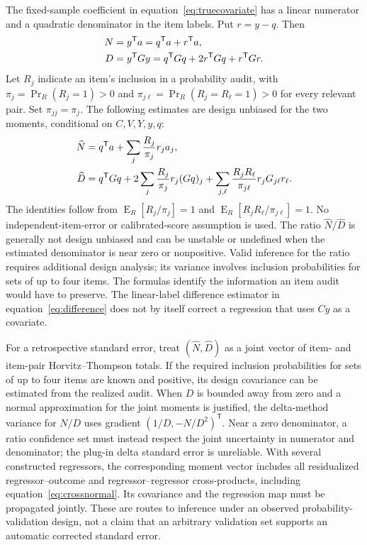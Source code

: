 \documentclass[11pt,letterpaper]{article}
\newcommand{\E}{\operatorname{E}}
\begin{document}
The fixed-sample coefficient in equation~\eqref{eq:truecovariate} has a linear
numerator and a quadratic denominator in the item labels. Put
$r=y-q$. Then
\begin{align}
 N&=y^{\mathsf T}a=q^{\mathsf T}a+r^{\mathsf T}a,\notag\\
 D&=y^{\mathsf T}Gy=q^{\mathsf T}Gq+2r^{\mathsf T}Gq+r^{\mathsf T}Gr.
 \label{eq:covariatemoments}
\end{align}
Let $R_j$ indicate an item's inclusion in a probability audit, with
$\pi_j=\Pr_R(R_j=1)>0$ and
$\pi_{j\ell}=\Pr_R(R_j=R_\ell=1)>0$ for every relevant pair. Set
$\pi_{jj}=\pi_j$. The following estimates are design unbiased for the two
moments, conditional on $C,V,Y,y,q$:
\begin{align}
 \widehat N&=q^{\mathsf T}a+
   \sum_j\frac{R_j}{\pi_j}r_ja_j,\notag\\
 \widehat D&=q^{\mathsf T}Gq+
   2\sum_j\frac{R_j}{\pi_j}r_j(Gq)_j+
   \sum_{j,\ell}\frac{R_jR_\ell}{\pi_{j\ell}}r_jG_{j\ell}r_\ell.
 \label{eq:covariateaudit}
\end{align}
The identities follow from $\E_R[R_j/\pi_j]=1$ and
$\E_R[R_jR_\ell/\pi_{j\ell}]=1$. No independent-item-error or calibrated-score
assumption is used. The ratio $\widehat N/\widehat D$ is generally not
design unbiased and can be unstable or undefined when the estimated
denominator is near zero or nonpositive. Valid inference for the ratio
requires additional design analysis; its variance involves inclusion
probabilities for sets of up to four items. The formulas identify the
information an item audit would have to preserve. The linear-label
difference estimator in equation~\eqref{eq:difference} does not by itself
correct a regression that uses $Cy$ as a covariate.

For a retrospective standard error, treat $(\widehat N,\widehat D)$ as a
joint vector of item- and item-pair Horvitz--Thompson totals. If the required
inclusion probabilities for sets of up to four items are known and positive,
its design covariance can be estimated from the realized audit. When $D$ is
bounded away from zero and a normal approximation for the joint moments is
justified, the delta-method variance for $N/D$ uses gradient
$(1/D,-N/D^2)^{\mathsf T}$. Near a zero denominator, a ratio confidence set
must instead respect the joint uncertainty in numerator and denominator;
the plug-in delta standard error is unreliable. With several constructed
regressors, the corresponding moment vector includes all residualized
regressor--outcome and regressor--regressor cross-products, including
equation~\eqref{eq:crossnormal}. Its covariance and the regression map must
be propagated jointly. These are routes to inference under an observed
probability-validation design, not a claim that an arbitrary validation set
supports an automatic corrected standard error.


\FloatBarrier

\FloatBarrier

\FloatBarrier

\end{document}
